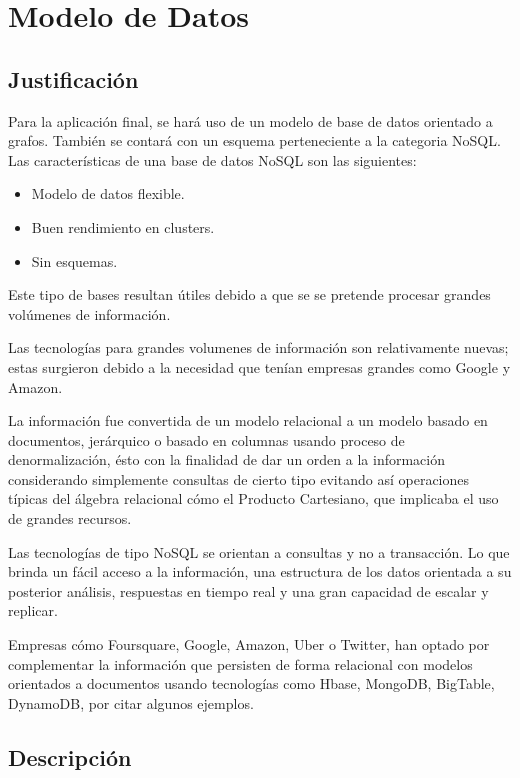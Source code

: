 \clearpage
\section{Modelo de Datos}

\subsection{Justificación}
Para la aplicación final, se hará uso de un modelo de base de datos orientado a grafos. También se contará con un esquema perteneciente a la categoria NoSQL.
Las características de una base de datos NoSQL son las siguientes: 

\begin{itemize}
	\item Modelo de datos flexible.
	\item Buen rendimiento en clusters.
	\item Sin esquemas.
\end{itemize}

Este tipo de bases resultan útiles debido a que se se pretende procesar grandes volúmenes de información.

Las tecnologías para grandes volumenes de información son relativamente nuevas; estas surgieron debido a la necesidad que tenían empresas grandes como Google y Amazon.

La información fue convertida de un modelo relacional a un modelo basado en documentos, jerárquico o basado en columnas usando proceso de denormalización, ésto con la finalidad de dar un orden a la información considerando simplemente consultas de cierto tipo evitando así operaciones típicas del álgebra relacional cómo el Producto Cartesiano, que implicaba el uso de grandes recursos.

Las tecnologías de tipo NoSQL se orientan a consultas y no a transacción. Lo que brinda un fácil acceso a la información, una estructura de los datos orientada a su posterior análisis, respuestas en tiempo real y una gran capacidad de escalar y replicar.

Empresas cómo Foursquare, Google, Amazon, Uber o Twitter, han optado por complementar la información que persisten de forma relacional con modelos orientados a documentos usando tecnologías como Hbase, MongoDB, BigTable, DynamoDB, por citar algunos ejemplos.

\subsection{Descripción}

